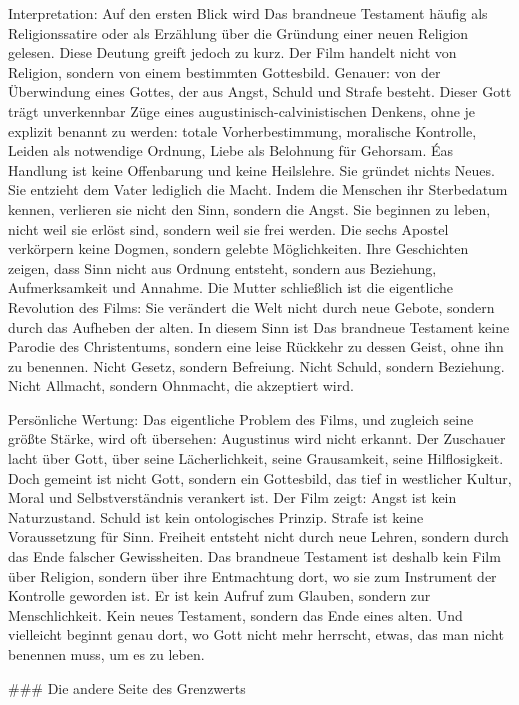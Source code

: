 \documentclass[
  ngerman,
]{article}
\begin{document}
Interpretation: Auf den ersten Blick wird Das brandneue Testament häufig
als Religionssatire oder als Erzählung über die Gründung einer neuen
Religion gelesen. Diese Deutung greift jedoch zu kurz. Der Film handelt
nicht von Religion, sondern von einem bestimmten Gottesbild. Genauer:
von der Überwindung eines Gottes, der aus Angst, Schuld und Strafe
besteht. Dieser Gott trägt unverkennbar Züge eines
augustinisch-calvinistischen Denkens, ohne je explizit benannt zu
werden: totale Vorherbestimmung, moralische Kontrolle, Leiden als
notwendige Ordnung, Liebe als Belohnung für Gehorsam. Éas Handlung ist
keine Offenbarung und keine Heilslehre. Sie gründet nichts Neues. Sie
entzieht dem Vater lediglich die Macht. Indem die Menschen ihr
Sterbedatum kennen, verlieren sie nicht den Sinn, sondern die Angst. Sie
beginnen zu leben, nicht weil sie erlöst sind, sondern weil sie frei
werden. Die sechs Apostel verkörpern keine Dogmen, sondern gelebte
Möglichkeiten. Ihre Geschichten zeigen, dass Sinn nicht aus Ordnung
entsteht, sondern aus Beziehung, Aufmerksamkeit und Annahme. Die Mutter
schließlich ist die eigentliche Revolution des Films: Sie verändert die
Welt nicht durch neue Gebote, sondern durch das Aufheben der alten. In
diesem Sinn ist Das brandneue Testament keine Parodie des Christentums,
sondern eine leise Rückkehr zu dessen Geist, ohne ihn zu benennen. Nicht
Gesetz, sondern Befreiung. Nicht Schuld, sondern Beziehung. Nicht
Allmacht, sondern Ohnmacht, die akzeptiert wird.

Persönliche Wertung: Das eigentliche Problem des Films, und zugleich
seine größte Stärke, wird oft übersehen: Augustinus wird nicht erkannt.
Der Zuschauer lacht über Gott, über seine Lächerlichkeit, seine
Grausamkeit, seine Hilflosigkeit. Doch gemeint ist nicht Gott, sondern
ein Gottesbild, das tief in westlicher Kultur, Moral und
Selbstverständnis verankert ist. Der Film zeigt: Angst ist kein
Naturzustand. Schuld ist kein ontologisches Prinzip. Strafe ist keine
Voraussetzung für Sinn. Freiheit entsteht nicht durch neue Lehren,
sondern durch das Ende falscher Gewissheiten. Das brandneue Testament
ist deshalb kein Film über Religion, sondern über ihre Entmachtung dort,
wo sie zum Instrument der Kontrolle geworden ist. Er ist kein Aufruf zum
Glauben, sondern zur Menschlichkeit. Kein neues Testament, sondern das
Ende eines alten. Und vielleicht beginnt genau dort, wo Gott nicht mehr
herrscht, etwas, das man nicht benennen muss, um es zu leben.

\#\#\# Die andere Seite des Grenzwerts
\end{document}
